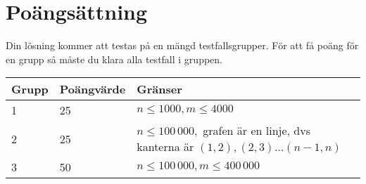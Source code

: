 \section*{Poängsättning}
Din lösning kommer att testas på en mängd testfallsgrupper. För att få poäng för en grupp
så måste du klara alla testfall i gruppen.

\noindent
\begin{tabular}{| l | l | l | l |}
\hline
Grupp & Poängvärde & Gränser \\ \hline
	1     & 25 & $n \le 1000, m \le 4000$ \\ \hline
	2     & 25 & $n \le 100\,000,$ grafen är en linje, dvs  kanterna är $(1,2),(2,3) \dots (n-1,n)$  \\ \hline
	3     & 50 & $n \le 100\,000, m \le 400\,000$ \\ \hline

\end{tabular}

